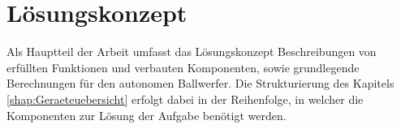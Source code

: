 \section{Lösungskonzept}
Als Hauptteil der Arbeit umfasst das Lösungskonzept Beschreibungen von erfüllten 
Funktionen und verbauten Komponenten, sowie grundlegende Berechnungen für den 
autonomen Ballwerfer. Die Strukturierung des Kapitels \ref{shap:Geraeteuebersicht} 
erfolgt dabei in der Reihenfolge, in welcher die Komponenten zur Lösung der 
Aufgabe benötigt werden.